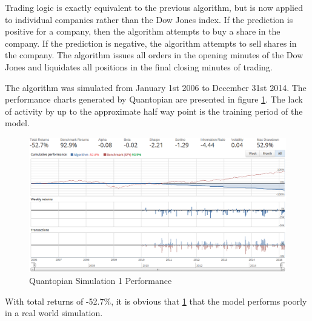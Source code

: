 \documentclass{report}
\begin{document}
Trading logic is exactly equivalent to the previous algorithm, but is now applied to individual companies rather than the Dow Jones index. If the prediction is positive for a company, then the algorithm attempts to buy a share in the company. If the prediction is negative, the algorithm attempts to sell shares in the company. The algorithm issues all orders in the opening minutes of the Dow Jones and liquidates all positions in the final closing minutes of trading.

The algorithm was simulated from January 1st 2006 to December 31st 2014. The performance charts generated by Quantopian are presented in figure \ref{fig:quantopian-2}. The lack of activity by up to the approximate half way point is the training period of the model.

\begin{figure}[H]
	\caption{Quantopian Simulation 1 Performance}
	\vspace{10pt}
	\centerline{\includegraphics[scale=0.4]{vis/quantopian_analysts.png}}
	
	\label{fig:quantopian-2}
\end{figure}

With total returns of -52.7\%, it is obvious that \ref{fig:quantopian-2} that the model performs poorly in a real world simulation. 
\end{document}

